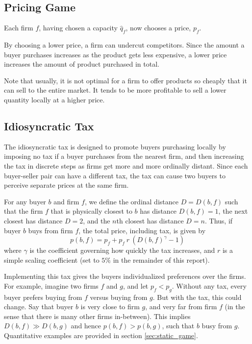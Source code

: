 \documentclass[final,3p,times,authoryear,12pt]{elsarticle}
\begin{document}
\subsection{Pricing Game}

Each firm $f$, having chosen a capacity $\hat q_f$, now chooses a price, $p_f$. 

By choosing a lower price, a firm can undercut competitors. 
Since the amount a buyer purchases increases as the product gets less expensive, a lower price increases the amount of product purchased in total. 

Note that usually, it is not optimal for a firm to offer products so cheaply that it can sell to the entire market. 
It tends to be more profitable to sell a lower quantity locally at a higher price.

\subsection{Idiosyncratic Tax}
The idiosyncratic tax is designed to promote buyers purchasing locally by
imposing no tax if a buyer purchases from the nearest firm, and then increasing
the tax in discrete steps as firms get more and more ordinally distant. Since
each buyer-seller pair can have a different tax, the tax can cause two buyers
to perceive separate prices at the same firm.

For any buyer $b$ and firm $f$, we define the ordinal distance $D = D(b,f)$
such that the firm $f$ that is physically closest to $b$ has distance
$D(b,f)=1$, the next closest has distance $D=2$, and the $n$th closest has
distance $D=n$.  Thus, if buyer $b$ buys from firm $f$, the total price,
including tax, is given by 
\begin{equation}
	p(b,f) = p_f + p_f ~ r~ \left( D(b,f)^\gamma - 1 \right)
\end{equation}
where $\gamma$ is the coefficient governing how quickly the tax increases, and
$r$ is a simple scaling coefficient (set to $5\%$ in the remainder of this report). 

Implementing this tax gives the buyers individualized preferences over the firms. 
For example, imagine two firms $f$ and $g$, and let $p_f <p_g$. 
Without any tax, every buyer prefers buying from $f$ versus buying from $g$. 
But with the tax, this could change. 
Say that buyer $b$ is very close to firm $g$, and very far from firm $f$ (in the sense that there is many other firms in-between). 
This implies $D(b,f) \gg D(b,g)$ and hence $p(b,f) > p(b,g)$, such that $b$ busy from $g$. 
Quantitative examples are provided in section \ref{sec:static_game}. 
\end{document}
